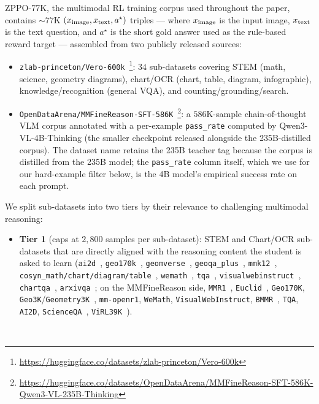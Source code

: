 \documentclass{llmxive}
\begin{document}
ZPPO-77K, the multimodal RL training corpus used throughout the paper, contains $\sim$$77$K $(x_{\rm image},x_{\rm text},a^{\star})$ triples --- where $x_{\rm image}$ is the input image, $x_{\rm text}$ is the text question, and $a^{\star}$ is the short gold answer used as the rule-based reward target --- assembled from two publicly released sources:
\begin{itemize}[leftmargin=12pt,topsep=2pt,itemsep=2pt]
    \item \texttt{zlab-princeton/Vero-600k}~\citep{sarch2026vero}\footnote{\url{https://huggingface.co/datasets/zlab-princeton/Vero-600k}}: $34$ sub-datasets covering STEM (math, science, geometry diagrams), chart/OCR (chart, table, diagram, infographic), knowledge/recognition (general VQA), and counting/grounding/search.
    \item \texttt{OpenDataArena/MMFineReason-SFT-586K}~\citep{lin2026mmfinereason}\footnote{\url{https://huggingface.co/datasets/OpenDataArena/MMFineReason-SFT-586K-Qwen3-VL-235B-Thinking}}: a $586$K-sample chain-of-thought VLM corpus annotated with a per-example \texttt{pass\_rate} computed by Qwen3-VL-4B-Thinking (the smaller checkpoint released alongside the 235B-distilled corpus). The dataset name retains the 235B teacher tag because the corpus is distilled from the 235B model; the \texttt{pass\_rate} column itself, which we use for our hard-example filter below, is the 4B model's empirical success rate on each prompt.
\end{itemize}
We split sub-datasets into two tiers by their relevance to challenging multimodal reasoning:
\begin{itemize}[leftmargin=12pt,topsep=2pt,itemsep=2pt]
    \item \textbf{Tier 1} (caps at $2{,}800$ samples per sub-dataset): STEM and Chart/OCR sub-datasets that are directly aligned with the reasoning content the student is asked to learn (\texttt{ai2d}~\citep{kembhavi2016diagram}, \texttt{geo170k}~\citep{gao2023g}, \texttt{geomverse}~\citep{kazemi2023geomverse}, \texttt{geoqa\_plus}~\citep{cao2022augmented}, \texttt{mmk12}~\citep{meng2025mmeureka}, \texttt{cosyn\_math/chart/diagram/table}~\citep{yang2025cosyn}, \texttt{wemath}~\citep{qiao2024we}, \texttt{tqa}~\citep{kembhavi2017you}, \texttt{visualwebinstruct}~\citep{jia2025visualwebinstruct}, \texttt{chartqa}~\citep{masry2022chartqa}, \texttt{arxivqa}~\citep{li2024multimodal}; on the MMFineReason side, \texttt{MMR1}~\citep{leng2025mmr1}, \texttt{Euclid}~\citep{zhang2024euclid}, \texttt{Geo170K}, \texttt{Geo3K}/\texttt{Geometry3K}~\citep{lu2021inter}, \texttt{mm-openr1}, \texttt{WeMath}, \texttt{VisualWebInstruct}, \texttt{BMMR}~\citep{xi2025bmmr}, \texttt{TQA}, \texttt{AI2D}, \texttt{ScienceQA}~\citep{lu2022learn}, \texttt{ViRL39K}~\citep{wang2025vlrethinker}).

\end{itemize}$$
\end{document}
